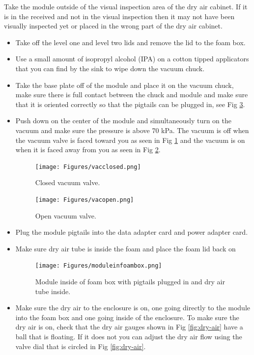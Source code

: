 \documentclass[12pt]{article}
\begin{document}
Take the module outside of the visual inspection area of the dry air cabinet. If it is in the received and not in the visual inspection then it may not have been visually inspected yet or placed in the wrong part of the dry air cabinet.  
\begin{itemize}
    \item Take off the level one and level two lids and remove the lid to the foam box. 
    \item Use a small amount of isopropyl alcohol (IPA) on a cotton tipped applicators that you can find by the sink to wipe down the vacuum chuck.
    \item Take the base plate off of the module and place it on the vacuum chuck, make sure there is full contact between the chuck and module and make sure that it is oriented correctly so that the pigtails can be plugged in, see Fig \ref{fig:module-in-foam}. 
    \item Push down on the center of the module and simultaneously turn on the vacuum and make sure the pressure is above 70 kPa. The vacuum is off when the vacuum valve is faced toward you as seen in Fig \ref{fig:vac-closed} and the vacuum is on when it is faced away from you as seen in Fig \ref{fig:vac-open}.
\begin{figure}[H]
    \centering
    \texttt{[image: Figures/vacclosed.png]}
    \caption{Closed vacuum valve.}
    \label{fig:vac-closed}
\end{figure}
\begin{figure}[H]
    \centering
    \texttt{[image: Figures/vacopen.png]}
    \caption{Open vacuum valve.}
    \label{fig:vac-open}
\end{figure}
    \item Plug the module pigtails into the data adapter card and power adapter card. 
    \item Make sure dry air tube is inside the foam and place the foam lid back on
\begin{figure}[H]
    \centering
    \texttt{[image: Figures/moduleinfoambox.png]}
    \caption{Module inside of foam box with pigtails plugged in and dry air tube inside.}
    \label{fig:module-in-foam}
\end{figure}
    \item Make sure the dry air to the enclosure is on, one going directly to the module into the foam box and one going inside of the enclosure. 
To make sure the dry air is on, check that the dry air gauges shown in Fig \ref{fig:dry-air} have a ball that is floating. If it does not you can adjust the dry air flow using the valve dial that is circled in Fig \ref{fig:dry-air}.


\end{itemize}
\end{document}
